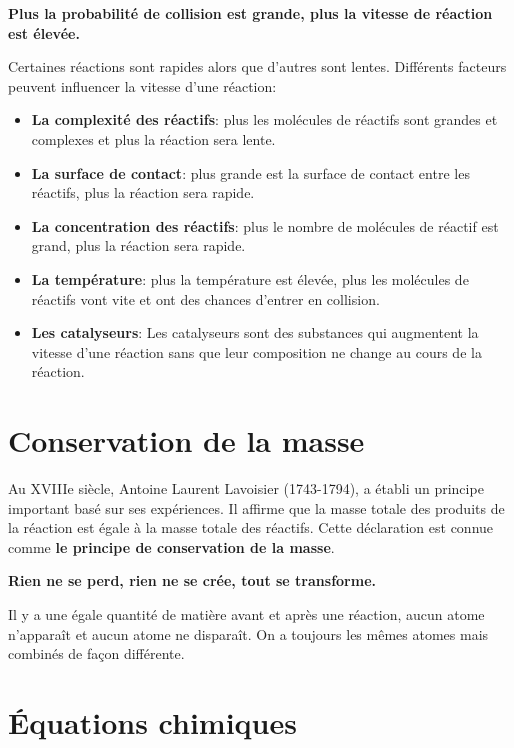 \documentclass[
  11pt,
  french,
  a4paper,
  openany]{book}
\providecommand{\tightlist}{%
  \setlength{\itemsep}{0pt}\setlength{\parskip}{0pt}}
\begin{document}
\textbf{Plus la probabilité de collision est grande, plus la vitesse de réaction est élevée.}

Certaines réactions sont rapides alors que d'autres sont lentes. Différents facteurs peuvent influencer la vitesse d'une réaction:

\begin{itemize}
\tightlist
\item
  \textbf{La complexité des réactifs}: plus les molécules de réactifs sont grandes et complexes et plus la réaction sera lente.
\item
  \textbf{La surface de contact}: plus grande est la surface de contact entre les réactifs, plus la réaction sera rapide.
\item
  \textbf{La concentration des réactifs}: plus le nombre de molécules de réactif est grand, plus la réaction sera rapide.
\item
  \textbf{La température}: plus la température est élevée, plus les molécules de réactifs vont vite et ont des chances d'entrer en collision.
\item
  \textbf{Les catalyseurs}: Les catalyseurs sont des substances qui augmentent la vitesse d'une réaction sans que leur composition ne change au cours de la réaction.
\end{itemize}

\hypertarget{conservation-de-la-masse}{%
\section{Conservation de la masse}\label{conservation-de-la-masse}}

Au XVIIIe siècle, Antoine Laurent Lavoisier (1743-1794), a établi un principe important basé sur ses expériences. Il affirme que la masse totale des produits de la réaction est égale à la masse totale des réactifs. Cette déclaration est connue comme \textbf{le principe de conservation de la masse}.

\textbf{Rien ne se perd, rien ne se crée, tout se transforme.}

Il y a une égale quantité de matière avant et après une réaction, aucun atome n'apparaît et aucun atome ne disparaît. On a toujours les mêmes atomes mais combinés de façon différente.

\hypertarget{uxe9quations-chimiques}{%
\section{Équations chimiques}\label{uxe9quations-chimiques}}
\end{document}
